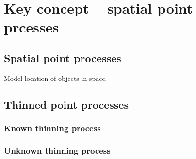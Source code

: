 \chapter{Key concept -- spatial point prcesses}

\section{Spatial point processes}

Model location of objects in space.

\section{Thinned point processes}

\subsection{Known thinning process}

\subsection{Unknown thinning process}


